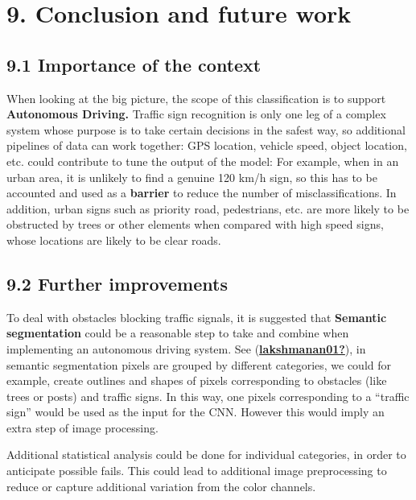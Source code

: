 \documentclass[
  11pt,
]{article}
\begin{document}
\pagebreak

\hypertarget{conclusion-and-future-work}{%
\section{9. Conclusion and future
work}\label{conclusion-and-future-work}}

\hypertarget{importance-of-the-context}{%
\subsection{9.1 Importance of the
context}\label{importance-of-the-context}}

When looking at the big picture, the scope of this classification is to
support \textbf{Autonomous Driving.} Traffic sign recognition is only
one leg of a complex system whose purpose is to take certain decisions
in the safest way, so additional pipelines of data can work together:
GPS location, vehicle speed, object location, etc. could contribute to
tune the output of the model: For example, when in an urban area, it is
unlikely to find a genuine 120 km/h sign, so this has to be accounted
and used as a \textbf{barrier} to reduce the number of
misclassifications. In addition, urban signs such as priority road,
pedestrians, etc. are more likely to be obstructed by trees or other
elements when compared with high speed signs, whose locations are likely
to be clear roads.

\hypertarget{further-improvements}{%
\subsection{9.2 Further improvements}\label{further-improvements}}

To deal with obstacles blocking traffic signals, it is suggested that
\textbf{Semantic segmentation} could be a reasonable step to take and
combine when implementing an autonomous driving system. See
(\protect\hyperlink{ref-lakshmanan01}{\textbf{lakshmanan01?}}), in
semantic segmentation pixels are grouped by different categories, we
could for example, create outlines and shapes of pixels corresponding to
obstacles (like trees or posts) and traffic signs. In this way, one
pixels corresponding to a ``traffic sign'' would be used as the input
for the CNN. However this would imply an extra step of image processing.

Additional statistical analysis could be done for individual categories,
in order to anticipate possible fails. This could lead to additional
image preprocessing to reduce or capture additional variation from the
color channels.
\end{document}
